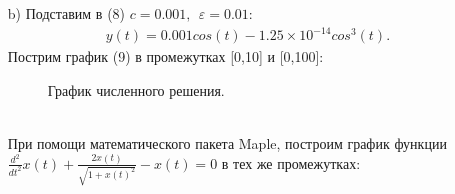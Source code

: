 \documentclass[12pt]{article}
\begin{document}
\begin{itemize}
    \item[b)]
        Подставим в (8) $c=0.001,\:\:\varepsilon=0.01$:
        \begin{eqnarray}
            y(t)=0.001cos(t)-1.25\times 10^{-14}cos^3(t).
        \end{eqnarray}
        Пострим график (9) в промежутках [0,10] и [0,100]:
        \begin{figure}[!h]
            \begin{minipage}[h]{0.5\linewidth}
            \end{minipage}
            \hfill
            \begin{minipage}[h]{0.5\linewidth}
            \end{minipage}
            \caption{График численного решения.}
        \end{figure}
        \\При помощи математического пакета  Maple, построим график функции $\frac{d^2}{dt^2}x(t) + \frac{2x(t)}{\sqrt{1 + x(t)^2}} - x(t) = 0$
        в тех же промежутках:
        \begin{figure}[!h]
            \begin{minipage}[h]{0.5\linewidth}

\end{minipage}
\end{figure}
\end{itemize}
\end{document}
